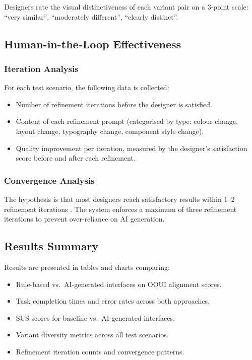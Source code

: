 Designers rate the visual distinctiveness of each variant pair on a 3-point scale: ``very similar'', ``moderately different'', ``clearly distinct''.


\subsection{Human-in-the-Loop Effectiveness}

\subsubsection{Iteration Analysis}

For each test scenario, the following data is collected:

\begin{itemize}
    \item Number of refinement iterations before the designer is satisfied.
    \item Content of each refinement prompt (categorised by type: colour change, layout change, typography change, component style change).
    \item Quality improvement per iteration, measured by the designer's satisfaction score before and after each refinement.
\end{itemize}

\subsubsection{Convergence Analysis}

The hypothesis is that most designers reach satisfactory results within 1--2 refinement iterations \cite{dH24, Ver25}. The system enforces a maximum of three refinement iterations to prevent over-reliance on AI generation.


\subsection{Results Summary}

Results are presented in tables and charts comparing:

\begin{itemize}
    \item Rule-based vs.\ AI-generated interfaces on OOUI alignment scores.
    \item Task completion times and error rates across both approaches.
    \item SUS scores for baseline vs.\ AI-generated interfaces.
    \item Variant diversity metrics across all test scenarios.
    \item Refinement iteration counts and convergence patterns.
\end{itemize}


